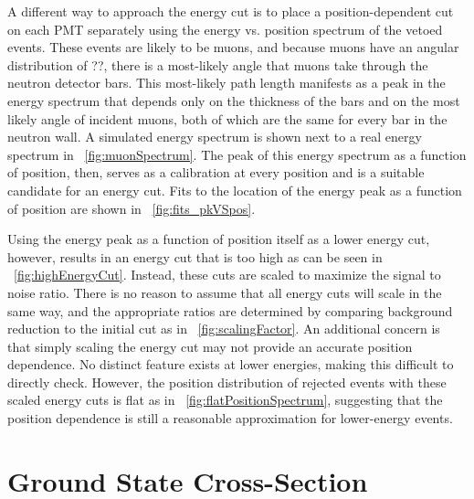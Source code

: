 A different way to approach the energy cut is to place a position-dependent cut on each PMT separately using the energy vs. position spectrum of the vetoed events.  These events are likely to be muons, and because muons have an angular distribution of ??, there is a most-likely angle that muons take through the neutron detector bars.  This most-likely path length manifests as a peak in the energy spectrum that depends only on the thickness of the bars and on the most likely angle of incident muons, both of which are the same for every bar in the neutron wall.  A simulated energy spectrum is shown next to a real energy spectrum in {\fig}~\ref{fig:muonSpectrum}.  The peak of this energy spectrum as a function of position, then, serves as a calibration at every position and is a suitable candidate for an energy cut.  Fits to the location of the energy peak as a function of position are shown in {\fig}~\ref{fig:fits_pkVSpos}.

Using the energy peak as a function of position itself as a lower energy cut, however, results in an energy cut that is too high as can be seen in {\fig}~\ref{fig:highEnergyCut}.  Instead, these cuts are scaled to maximize the signal to noise ratio.  There is no reason to assume that all energy cuts will scale in the same way, and the appropriate ratios are determined by comparing background reduction to the initial cut as in {\fig}~\ref{fig:scalingFactor}.  An additional concern is that simply scaling the energy cut may not provide an accurate position dependence.  No distinct feature exists at lower energies, making this difficult to directly check.  However, the position distribution of rejected events with these scaled energy cuts is flat as in {\fig}~\ref{fig:flatPositionSpectrum}, suggesting that the position dependence is still a reasonable approximation for lower-energy events.

\section{Ground State Cross-Section}

